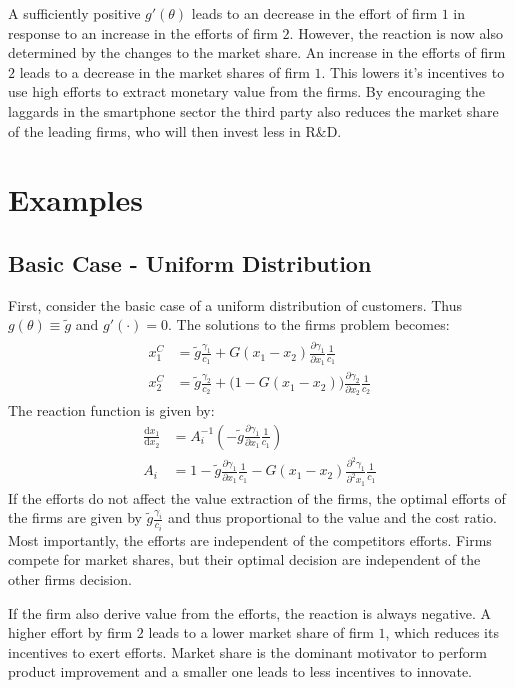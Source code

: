 \documentclass[a4paper, 11pt]{article}
\renewcommand{\d}{\text{d}}
\begin{document}
A sufficiently positive $g'(\theta)$ leads to an decrease in the effort of firm $1$ in response to an increase in the efforts of firm $2$. However, the reaction is now also determined by the changes to the market share. An increase in the efforts of firm $2$ leads to a decrease in the market shares of firm $1$. This lowers it's incentives to use high efforts to extract monetary value from the firms. By encouraging the laggards in the smartphone sector the third party also reduces the market share of the leading firms, who will then invest less in R\&D.

\section{Examples}
\subsection{Basic Case - Uniform Distribution}
First, consider the basic case of a uniform distribution of customers. Thus $g(\theta)\equiv\tilde{g}$ and $g'(\cdot)=0$. The solutions to the firms problem becomes:
\begin{align}
\begin{split}
x_1^C &= \tilde{g}\frac{\gamma_1}{c_1} + G(x_1-x_2)\frac{\partial \gamma_1}{\partial x_1}\frac{1}{c_1}\\
x_2^C &= \tilde{g}\frac{\gamma_2}{c_2} + \big(1-G(x_1-x_2)\big)\frac{\partial \gamma_2}{\partial x_2}\frac{1}{c_2}
\end{split}
\end{align}
The reaction function is given by:
\begin{align*}
\frac{\d x_1}{\d x_2} &= A_i^{-1} \left( -\tilde{g}\frac{\partial \gamma_1}{\partial x_1}\frac{1}{c_1}\right)\\
A_i &= 1 -\tilde{g}\frac{\partial \gamma_1}{\partial x_1}\frac{1}{c_1}-G(x_1-x_2)\frac{\partial^2 \gamma_1}{\partial^2 x_1}\frac{1}{c_1}
\end{align*}
If the efforts do not affect the value extraction of the firms, the optimal efforts of the firms are given by $\tilde{g}\frac{\gamma_i}{c_i}$ and thus proportional to the value and the cost ratio. Most importantly, the efforts are independent of the competitors efforts. Firms compete for market shares, but their optimal decision are independent of the other firms decision.

If the firm also derive value from the efforts, the reaction is always negative. A higher effort by firm $2$ leads to a lower market share of firm $1$, which reduces its incentives to exert efforts. Market share is the dominant motivator to perform product improvement and a smaller one leads to less incentives to innovate. 
\end{document}

